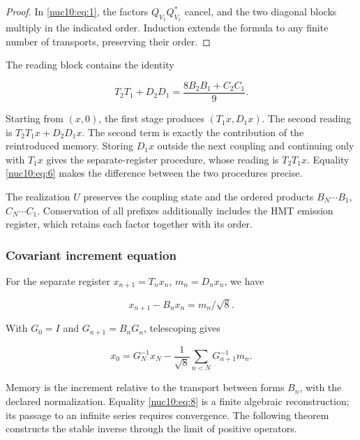\begin{proof}
In \eqref{nuc10:eq:1}, the factors \(Q_{V_1}Q_{V_1}^*\) cancel, and the two diagonal blocks multiply in the indicated order. Induction extends the formula to any finite number of transports, preserving their order.
\end{proof}

The reading block contains the identity

\begin{equation}
\boxed{T_2T_1+D_2D_1=\frac{8B_2B_1+C_2C_1}{9}.}
\label{nuc10:eq:6}
\end{equation}

Starting from \((x,0)\), the first stage produces \((T_1x,D_1x)\). The second reading is \(T_2T_1x+D_2D_1x\). The second term is exactly the contribution of the reintroduced memory. Storing \(D_1x\) outside the next coupling and continuing only with \(T_1x\) gives the separate-register procedure, whose reading is \(T_2T_1x\). Equality \eqref{nuc10:eq:6} makes the difference between the two procedures precise.

The realization \(U\) preserves the coupling state and the ordered products \(B_N\cdots B_1\), \(C_N\cdots C_1\). Conservation of all prefixes additionally includes the HMT emission register, which retains each factor together with its order.

\subsubsection{Covariant increment equation}

For the separate register \(x_{n+1}=T_nx_n\), \(m_n=D_nx_n\), we have

\begin{equation}
x_{n+1}-B_nx_n=m_n/\sqrt8.
\label{nuc10:eq:7}
\end{equation}

With \(G_0=I\) and \(G_{n+1}=B_nG_n\), telescoping gives

\begin{equation}
x_0=G_N^{-1}x_N-\frac1{\sqrt8}\sum_{n<N}G_{n+1}^{-1}m_n.
\label{nuc10:eq:8}
\end{equation}

Memory is the increment relative to the transport between forms \(B_n\), with the declared normalization. Equality \eqref{nuc10:eq:8} is a finite algebraic reconstruction; its passage to an infinite series requires convergence. The following theorem constructs the stable inverse through the limit of positive operators.


